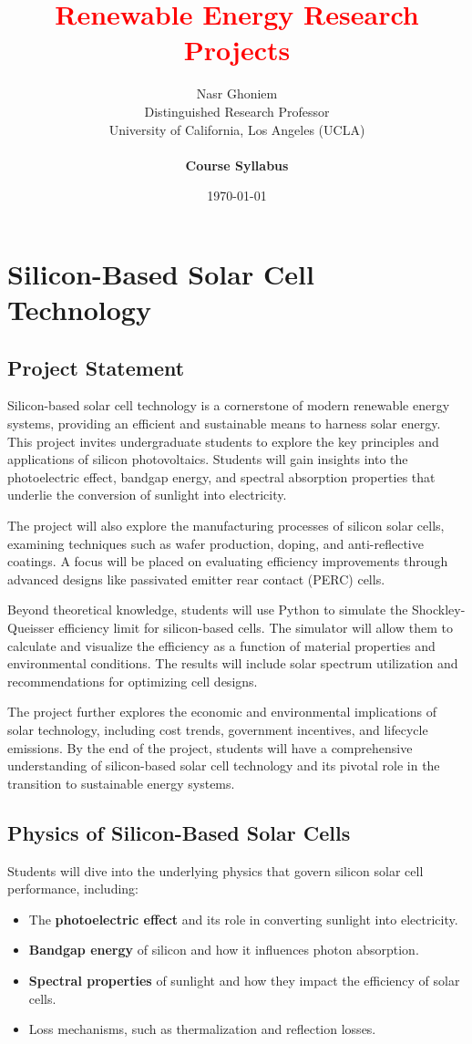 \documentclass[11pt]{article}
\title{{\Huge\textcolor{red}{Renewable Energy Research Projects}}}
\author{Nasr Ghoniem\\Distinguished Research Professor\\University of California, Los Angeles (UCLA)\\~ \\\textbf{Course Syllabus}}
\date{\today}
\begin{document}
\maketitle

\tableofcontents
\newpage
\section{Silicon-Based Solar Cell Technology}
\subsection{ Project Statement}
Silicon-based solar cell technology is a cornerstone of modern renewable energy systems, providing an efficient and sustainable means to harness solar energy. This project invites undergraduate students to explore the key principles and applications of silicon photovoltaics. Students will gain insights into the photoelectric effect, bandgap energy, and spectral absorption properties that underlie the conversion of sunlight into electricity. 

The project will also explore the manufacturing processes of silicon solar cells, examining techniques such as wafer production, doping, and anti-reflective coatings. A focus will be placed on evaluating efficiency improvements through advanced designs like passivated emitter rear contact (PERC) cells.

Beyond theoretical knowledge, students will use Python to simulate the Shockley-Queisser efficiency limit for silicon-based cells. The simulator will allow them to calculate and visualize the efficiency as a function of material properties and environmental conditions. The results will include solar spectrum utilization and recommendations for optimizing cell designs.

The project further explores the economic and environmental implications of solar technology, including cost trends, government incentives, and lifecycle emissions. By the end of the project, students will have a comprehensive understanding of silicon-based solar cell technology and its pivotal role in the transition to sustainable energy systems.

\subsection{Physics of Silicon-Based Solar Cells}
Students will dive into the underlying physics that govern silicon solar cell performance, including:
\begin{itemize}
    \item The \textbf{photoelectric effect} and its role in converting sunlight into electricity.
    \item \textbf{Bandgap energy} of silicon and how it influences photon absorption.
    \item \textbf{Spectral properties} of sunlight and how they impact the efficiency of solar cells.
    \item Loss mechanisms, such as thermalization and reflection losses.
\end{itemize}
\end{document}
